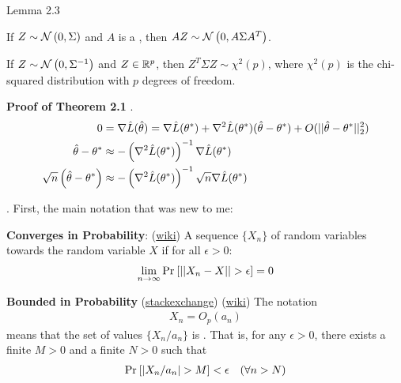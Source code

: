 \documentclass[11pt]{article}
\begin{document}
\begin{itemdefinition}{Lemma 2.3}{}
	\item If $Z \sim \mathcal{N}\left( 0, \Sigma \right)$ and $A$ is a , then $AZ \sim \mathcal{N}\left( 0, A \Sigma A^T \right)$. 
	
	\item If $Z \sim \mathcal{N}\left( 0, \Sigma^{-1} \right)$ and $Z \in \mathbb{R}^p$, then $Z^T \Sigma Z \sim \chi^2(p)$, where $\chi^2(p)$ is the chi-squared distribution with $p$ degrees of freedom. 
\end{itemdefinition}

\textbf{Proof of Theorem 2.1} . 
\begin{align}
	0 &= \nabla \hat{L}(\hat\theta) 
	      = \nabla \hat{L}(\theta^*) + \nabla^2 \hat{L}(\theta^*)(\hat\theta - \theta^*) + O(||\hat\theta - \theta^*||_2^2) \\
	\hat\theta - \theta^*
		&\approx  - \left(  \nabla^2 \hat{L}(\theta^*)   \right)^{-1}   \nabla \hat{L}(\theta^*)  \\
	\sqrt{n}\left( \hat\theta - \theta^* \right) 
		&\approx  - \left(  \nabla^2 \hat{L}(\theta^*)    \right)^{-1}  \sqrt{n}   \nabla \hat{L}(\theta^*)  
\end{align}


\begin{comment}
\begin{definition}[-1em][suh]
	uh
\end{definition}
\end{comment}

. First, the main notation that was new to me:
\begin{compactitem}
	\item \textbf{Converges in Probability}: (\href{https://www.wikiwand.com/en/Convergence_of_random_variables#/Definition_2}{wiki}) A sequence $\{ X_n \}$ of random variables  towards the random variable $X$ if for all $\epsilon > 0$:
	\begin{align} 
		\lim_{n \to \infty} \text{Pr}_{}\left[  ||  X_n - X || > \epsilon \right] = 0 
	\end{align}

	\item \textbf{Bounded in Probability} (\href{https://stats.stackexchange.com/questions/155667/understanding-big-little-o-p-o-p-notation-for-estimators/155679#155679}{stackexchange}) (\href{https://www.wikiwand.com/en/Big_O_in_probability_notation#/Big_O:_stochastic_boundedness}{wiki}) The notation 
	\begin{align}
		X_n = O_p(a_n)
	\end{align}
	means that the set of values $\{ X_n / a_n \}$ is . That is, for any $\epsilon > 0$, there exists a finite $M >0$ and a finite $N > 0$ such that
	\begin{align}
		\text{Pr}_{}\left[ |X_n / a_n | > M \right] < \epsilon \quad (\forall n > N)
	\end{align}
\end{compactitem}
\end{document}
